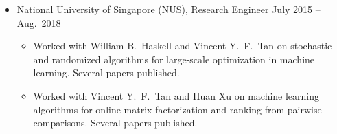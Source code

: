 \documentclass[11pt]{article}
\begin{document}
\begin{itemize}
\item National University of Singapore (NUS), {Research Engineer} \hfill July 2015 -- Aug.\ 2018
\begin{itemize}
\item Worked with William B.\ Haskell and Vincent Y.\ F.\ Tan on stochastic and randomized algorithms for large-scale optimization in machine learning. Several papers published. 
\item Worked with Vincent Y.\ F.\ Tan and Huan Xu on machine learning algorithms for online matrix factorization  and ranking from pairwise comparisons. Several papers published.  %
\end{itemize}

\end{itemize}







\end{document}
